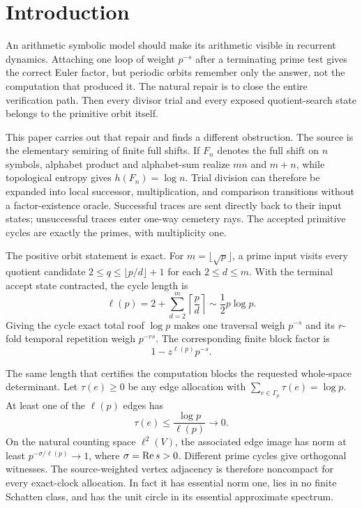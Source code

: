 \section{Introduction}
\label{sec:introduction}

An arithmetic symbolic model should make its arithmetic visible in recurrent
dynamics.  Attaching one loop of weight $p^{-s}$ after a terminating prime
test gives the correct Euler factor, but periodic orbits remember only the
answer, not the computation that produced it.  The natural repair is to close
the entire verification path.  Then every divisor trial and every exposed
quotient-search state belongs to the primitive orbit itself.

This paper carries out that repair and finds a different obstruction.  The
source is the elementary semiring of finite full shifts.  If $F_n$ denotes
the full shift on $n$ symbols, alphabet product and alphabet-sum realize
$mn$ and $m+n$, while topological entropy gives $h(F_n)=\log n$.  Trial
division can therefore be expanded into local successor, multiplication, and
comparison transitions without a factor-existence oracle.  Successful traces
are sent directly back to their input states; unsuccessful traces enter
one-way cemetery rays.  The accepted primitive cycles are exactly the
primes, with multiplicity one.

The positive orbit statement is exact.  For
$m=\lfloor\sqrt p\rfloor$, a prime input visits every quotient candidate
$2\le q\le\lfloor p/d\rfloor+1$ for each $2\le d\le m$.  With the terminal
accept state contracted, the cycle length is
\begin{equation}
\ell(p)=2+\sum_{d=2}^{m}\left\lceil\frac pd\right\rceil
       \sim\frac12p\log p.
\label{eq:intro-length}
\end{equation}
Giving the cycle exact total roof $\log p$ makes one traversal weigh $p^{-s}$
and its $r$-fold temporal repetition weigh $p^{-rs}$.  The corresponding
finite block factor is
\begin{equation}
1-z^{\ell(p)}p^{-s}.
\label{eq:intro-factor}
\end{equation}

The same length that certifies the computation blocks the requested
whole-space determinant.  Let $\tau(e)\ge0$ be any edge allocation with
$\sum_{e\in\Gamma_p}\tau(e)=\log p$.  At least one of the $\ell(p)$ edges
has
\[
\tau(e)\le\frac{\log p}{\ell(p)}\longrightarrow0.
\]
On the natural counting space $\ell^2(V)$, the associated edge image has norm
at least $p^{-\sigma/\ell(p)}\to1$, where $\sigma=\operatorname{Re} s>0$.
Different prime cycles give orthogonal witnesses.  The source-weighted vertex
adjacency is therefore noncompact for every exact-clock allocation.  In fact
it has essential norm one, lies in no finite Schatten class, and has the unit
circle in its essential approximate spectrum.

